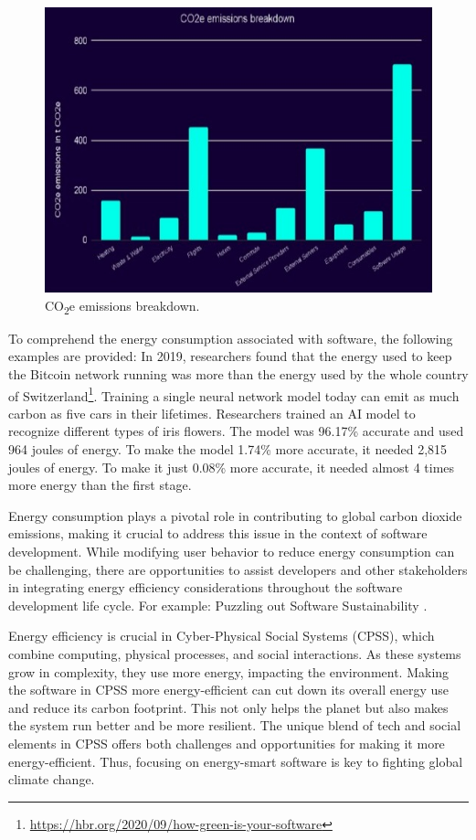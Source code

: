 \begin{figure}[htbp]
  \centering
  \includegraphics[width=.5\textwidth]{img/CO2_emission_each_level.jpg}
  \caption{CO\textsubscript{2}e emissions breakdown.\protect\footnotemark}
  \label{fig:CO2_emission_each_level}
\end{figure}

\vspace{.5em}
To comprehend the energy consumption associated with software, the following examples are provided:
In 2019, researchers found that the energy used to keep the Bitcoin network running was more than the energy used by the whole country of Switzerland\footnote{\url{https://hbr.org/2020/09/how-green-is-your-software}}. Training a single neural network model today can emit as much carbon as five cars in their lifetimes\footnotemark[9]. Researchers trained an AI model to recognize different types of iris flowers. The model was 96.17\% accurate and used 964 joules of energy. To make the model 1.74\% more accurate, it needed 2,815 joules of energy. To make it just 0.08\% more accurate, it needed almost 4 times more energy than the first stage\footnotemark[9].

\vspace{.5em}
Energy consumption plays a pivotal role in contributing to global carbon dioxide emissions, making it crucial to address this issue in the context of software development. While modifying user behavior to reduce energy consumption can be challenging, there are opportunities to assist developers and other stakeholders in integrating energy efficiency considerations throughout the software development life cycle. For example: Puzzling out Software Sustainability \cite{DBLP:journals/suscom/CaleroP17}.

\vspace{.5em}
Energy efficiency is crucial in Cyber-Physical Social Systems (CPSS), which combine computing, physical processes, and social interactions. As these systems grow in complexity, they use more energy, impacting the environment. Making the software in CPSS more energy-efficient can cut down its overall energy use and reduce its carbon footprint. This not only helps the planet but also makes the system run better and be more resilient. The unique blend of tech and social elements in CPSS offers both challenges and opportunities for making it more energy-efficient. Thus, focusing on energy-smart software is key to fighting global climate change.

